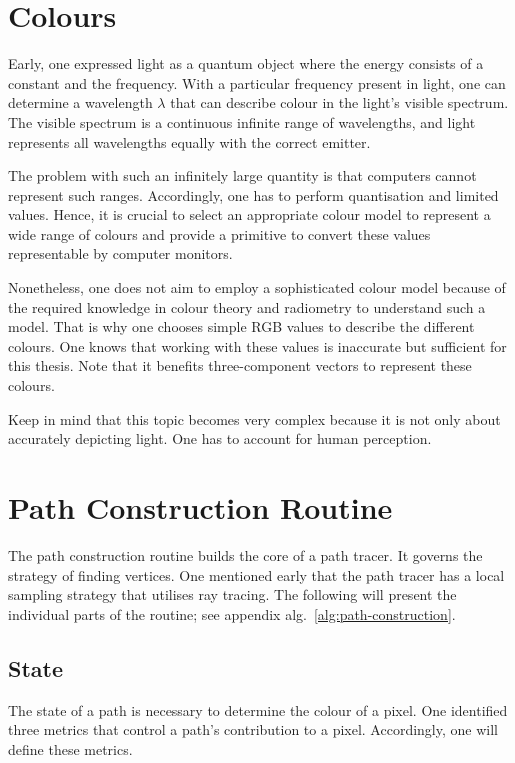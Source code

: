 \section{Colours}

Early, one expressed light as a quantum object where the energy consists of a constant and the frequency.
With a particular frequency present in light, one can determine a wavelength $\lambda$ that can describe colour in the light's visible spectrum.
The visible spectrum is a continuous infinite range of wavelengths, and light represents all wavelengths equally with the correct emitter.

The problem with such an infinitely large quantity is that computers cannot represent such ranges.
Accordingly, one has to perform quantisation and limited values.
Hence, it is crucial to select an appropriate colour model to represent a wide range of colours and provide a primitive to convert these values representable by computer monitors.

Nonetheless, one does not aim to employ a sophisticated colour model because of the required knowledge in colour theory and radiometry to understand such a model.
That is why one chooses simple RGB values to describe the different colours.
One knows that working with these values is inaccurate but sufficient for this thesis.
Note that it benefits three-component vectors to represent these colours.

Keep in mind that this topic becomes very complex because it is not only about accurately depicting light.
One has to account for human perception.

\section{Path Construction Routine}

The path construction routine builds the core of a path tracer.
It governs the strategy of finding vertices.
One mentioned early that the path tracer has a local sampling strategy that utilises ray tracing.
The following will present the individual parts of the routine; see appendix alg.~\ref{alg:path-construction}.

\subsection*{State}

The state of a path is necessary to determine the colour of a pixel.
One identified three metrics that control a path's contribution to a pixel.
Accordingly, one will define these metrics.

